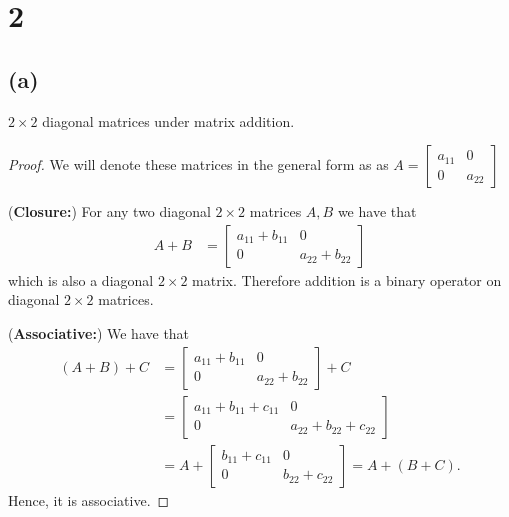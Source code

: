 \documentclass{article}
\begin{document}
\section*{2}
\subsection*{(a)}
$2\times 2$ diagonal matrices under matrix addition.

\begin{proof}
    We will denote these matrices in the general form as as $A = \begin{bmatrix}
            a_{11} & 0      \\
            0      & a_{22}
        \end{bmatrix}$

    (\textbf{Closure:})
    For any two diagonal $2\times 2$ matrices $A,B$ we have that
    \begin{align*}
        A + B & = \begin{bmatrix}
                      a_{11} + b_{11} & 0               \\
                      0               & a_{22} + b_{22}
                  \end{bmatrix}
    \end{align*}
    which is also a diagonal $2\times 2$ matrix.
    Therefore addition is a binary operator on diagonal $2\times 2$ matrices.


    (\textbf{Associative:})
    We have that
    \begin{align*}
        (A + B) + C & = \begin{bmatrix}
                            a_{11} + b_{11} & 0               \\
                            0               & a_{22} + b_{22}
                        \end{bmatrix} + C                   \\
                    & = \begin{bmatrix}
                            a_{11} + b_{11} + c_{11} & 0                        \\
                            0                        & a_{22} + b_{22} + c_{22}
                        \end{bmatrix} \\
                    & = A + \begin{bmatrix}
                                b_{11} + c_{11} & 0               \\
                                0               & b_{22} + c_{22}
                            \end{bmatrix} = A + (B+C).
    \end{align*}
    Hence, it is associative.


\end{proof}
\end{document}

